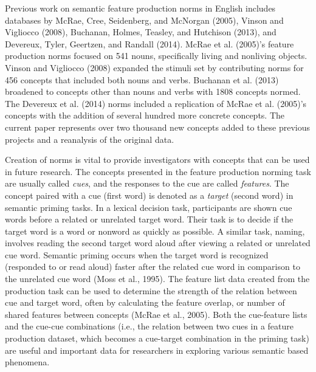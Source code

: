 \documentclass[english,,man]{apa6}
\begin{document}
Previous work on semantic feature production norms in English includes databases by McRae, Cree, Seidenberg, and McNorgan (2005), Vinson and Vigliocco (2008), Buchanan, Holmes, Teasley, and Hutchison (2013), and Devereux, Tyler, Geertzen, and Randall (2014). McRae et al. (2005)'s feature production norms focused on 541 nouns, specifically living and nonliving objects. Vinson and Vigliocco (2008) expanded the stimuli set by contributing norms for 456 concepts that included both nouns and verbs. Buchanan et al. (2013) broadened to concepts other than nouns and verbs with 1808 concepts normed. The Devereux et al. (2014) norms included a replication of McRae et al. (2005)'s concepts with the addition of several hundred more concrete concepts. The current paper represents over two thousand new concepts added to these previous projects and a reanalysis of the original data.

Creation of norms is vital to provide investigators with concepts that can be used in future research. The concepts presented in the feature production norming task are usually called \emph{cues}, and the responses to the cue are called \emph{features}. The concept paired with a cue (first word) is denoted as a \emph{target} (second word) in semantic priming tasks. In a lexical decision task, participants are shown cue words before a related or unrelated target word. Their task is to decide if the target word is a word or nonword as quickly as possible. A similar task, naming, involves reading the second target word aloud after viewing a related or unrelated cue word. Semantic priming occurs when the target word is recognized (responded to or read aloud) faster after the related cue word in comparison to the unrelated cue word (Moss et al., 1995). The feature list data created from the production task can be used to determine the strength of the relation between cue and target word, often by calculating the feature overlap, or number of shared features between concepts (McRae et al., 2005). Both the cue-feature lists and the cue-cue combinations (i.e., the relation between two cues in a feature production dataset, which becomes a cue-target combination in the priming task) are useful and important data for researchers in exploring various semantic based phenomena.
\end{document}
